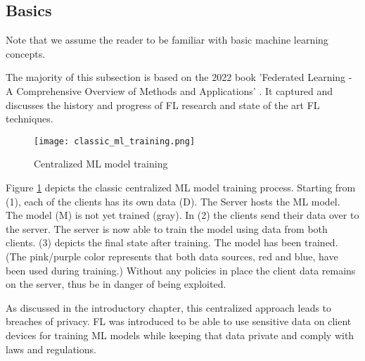 
\subsection{Basics}

Note that we assume the reader to be familiar with basic machine learning concepts.

The majority of this subsection is based on the 2022 book
'Federated Learning - A Comprehensive Overview of Methods and Applications' \cite{book:fl}.
It captured and discusses the history and progress of FL research and state of the art FL techniques.

\begin{figure}[h]
    \centering
    \texttt{[image: classic\_ml\_training.png]}
    \caption{Centralized ML model training}
    \label{fig:classic_ml_training}
\end{figure}
Figure \ref{fig:classic_ml_training} depicts the classic centralized ML model training process.
Starting from (1), each of the clients has its own data (D).
The Server hosts the ML model. The model (M) is not yet trained (gray).
In (2) the clients send their data over to the server.
The server is now able to train the model using data from both clients.
(3) depicts the final state after training.
The model has been trained.
(The pink/purple color represents that both data sources, red and blue,
have been used during training.)
Without any policies in place the client data remains on the server, thus
be in danger of being exploited.

As discussed in the introductory chapter, this centralized approach leads to
breaches of privacy. FL was introduced to be able to use sensitive data
on client devices for training ML models while keeping that data private and 
comply with laws and regulations.

